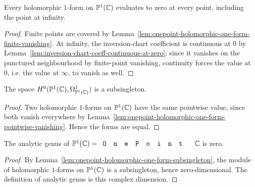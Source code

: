 \begin{lemma}
\label{lem:onepoint-holomorphic-one-form-pointwise-vanishing}
Every holomorphic \(1\)-form on \(\mathbb{P}^{1}(\mathbb{C})\) evaluates to zero at every point,
including the point at infinity.
\leanok
\end{lemma}
\begin{proof}\leanok
Finite points are covered by
Lemma~\ref{lem:onepoint-holomorphic-one-form-finite-vanishing}. At infinity,
the inversion-chart coefficient is continuous at \(0\) by
Lemma~\ref{lem:inversion-chart-coeff-continuous-at-zero}; since it vanishes on
the punctured neighbourhood by finite-point vanishing, continuity forces the
value at \(0\), i.e. the value at \(\infty\), to vanish as well.
\end{proof}

\begin{lemma}
\label{lem:onepoint-holomorphic-one-form-subsingleton}
The space \(H^{0}(\mathbb{P}^{1}(\mathbb{C}),\Omega^{1}_{\mathbb{P}^{1}(\mathbb{C})})\) is a subsingleton.
\leanok
\end{lemma}
\begin{proof}\leanok
Two holomorphic \(1\)-forms on \(\mathbb{P}^{1}(\mathbb{C})\) have the same pointwise value, since
both vanish everywhere by
Lemma~\ref{lem:onepoint-holomorphic-one-form-pointwise-vanishing}. Hence the
forms are equal.
\end{proof}

\begin{lemma}
\label{lem:analytic-genus-onepoint-zero}
The analytic genus of \(\CPone=\code{OnePoint}\,\C\) is zero.
\leanok
\end{lemma}
\begin{proof}\leanok
By Lemma~\ref{lem:onepoint-holomorphic-one-form-subsingleton}, the module of
holomorphic \(1\)-forms on \(\mathbb{P}^{1}(\mathbb{C})\) is a subsingleton, hence zero-dimensional.
The definition of analytic genus is this complex dimension.
\end{proof}

